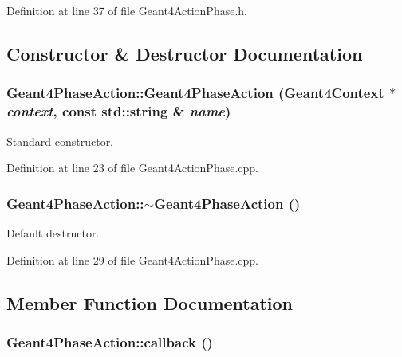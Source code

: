 Definition at line 37 of file Geant4ActionPhase.h.

\subsection{Constructor \& Destructor Documentation}
\hypertarget{class_d_d4hep_1_1_simulation_1_1_geant4_phase_action_ad15d56cd51ec30099dea4db3ab92ae52}{
\subsubsection[{Geant4PhaseAction}]{\setlength{\rightskip}{0pt plus 5cm}Geant4PhaseAction::Geant4PhaseAction ({\bf Geant4Context} $\ast$ {\em context}, \/  const std::string \& {\em name})}}
\label{class_d_d4hep_1_1_simulation_1_1_geant4_phase_action_ad15d56cd51ec30099dea4db3ab92ae52}


Standard constructor. 

Definition at line 23 of file Geant4ActionPhase.cpp.\hypertarget{class_d_d4hep_1_1_simulation_1_1_geant4_phase_action_aba4b3737a47e5f9aa71ee76c1292bfdd}{
\subsubsection[{$\sim$Geant4PhaseAction}]{\setlength{\rightskip}{0pt plus 5cm}Geant4PhaseAction::$\sim$Geant4PhaseAction ()}}
\label{class_d_d4hep_1_1_simulation_1_1_geant4_phase_action_aba4b3737a47e5f9aa71ee76c1292bfdd}


Default destructor. 

Definition at line 29 of file Geant4ActionPhase.cpp.

\subsection{Member Function Documentation}
\hypertarget{class_d_d4hep_1_1_simulation_1_1_geant4_phase_action_a2ec5c793439611a45e83c2fffd5093d2}{
\subsubsection[{callback}]{ Geant4PhaseAction::callback ()}}
\label{class_d_d4hep_1_1_simulation_1_1_geant4_phase_action_a2ec5c793439611a45e83c2fffd5093d2}


